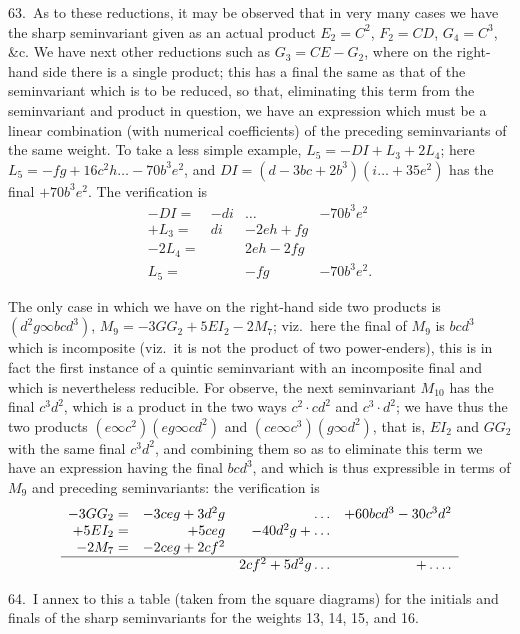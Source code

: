 \documentclass[11pt]{article}
\begin{document}
\clearpage
63.\ As to these reductions, it may be observed that in very many cases we have the sharp seminvariant given as an actual product $E_2 = C^2$, $F_2 = CD$, $G_4 = C^3$, \&c. We have next other reductions such as $G_3 = CE - G_2$, where on the right-hand side there is a single product; this has a final the same as that of the seminvariant which is to be reduced, so that, eliminating this term from the seminvariant and product in question, we have an expression which must be a linear combination (with numerical coefficients) of the preceding seminvariants of the same weight. To take a less simple example, $L_5 = - DI + L_3 + 2L_4$; here $L_5 = -fg + 16c^2h \ldots - 70b^3e^2$, and $DI = (d - 3bc + 2b^3)(i \ldots + 35e^2)$ has the final $+ 70b^3e^2$. The verification is
\[
\begin{array}{rrrr}
- DI = & -di & \ldots & -70b^3e^2 \\
+ L_3 = & di & -2eh + fg & \\
- 2L_4 = & & 2eh - 2fg & \\
\hline
L_5 = & & -fg & -70b^3e^2.
\end{array}
\]

The only case in which we have on the right-hand side two products is $(d^2g \infty bcd^3)$, $M_9 = -3GG_2 + 5EI_2 - 2M_7$; viz.\ here the final of $M_9$ is $bcd^3$ which is incomposite (viz.\ it is not the product of two power-enders), this is in fact the first instance of a quintic seminvariant with an incomposite final and which is nevertheless reducible. For observe, the next seminvariant $M_{10}$ has the final $c^3d^2$, which is a product in the two ways $c^2 \cdot cd^2$ and $c^3 \cdot d^2$; we have thus the two products $(e \infty c^2)(eg \infty cd^2)$ and $(ce \infty c^3)(g \infty d^2)$, that is, $EI_2$ and $GG_2$ with the same final $c^3d^2$, and combining them so as to eliminate this term we have an expression having the final $bcd^3$, and which is thus expressible in terms of $M_9$ and preceding seminvariants: the verification is
\[
\begin{array}{rrrr}
- 3GG_2 = & -3ceg + 3d^2g & \ldots & + 60bcd^3 - 30c^3d^2 \\
+ 5EI_2 = & +5ceg & -40d^2g + \ldots & \\
- 2M_7 = & -2ceg + 2cf^2 & & \\
\hline
& & 2cf^2 + 5d^2g \ldots & + \ldots.
\end{array}
\]

64.\ I annex to this a table (taken from the square diagrams) for the initials and finals of the sharp seminvariants for the weights 13, 14, 15, and 16.
\end{document}
